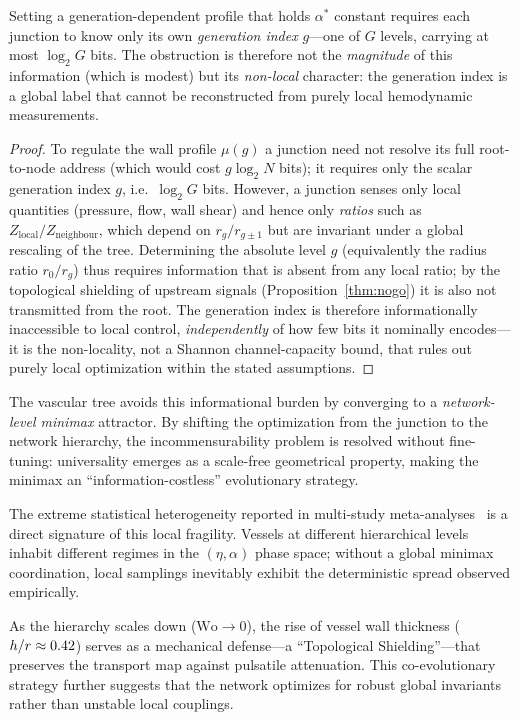 \begin{corollary}
\label{cor:information}
Setting a generation-dependent profile that holds $\alpha^*$ constant
requires each junction to know only its own \emph{generation index} $g$---one of
$G$ levels, carrying at most $\log_2 G$ bits. The obstruction is therefore not
the \emph{magnitude} of this information (which is modest) but its
\emph{non-local} character: the generation index is a global label that cannot
be reconstructed from purely local hemodynamic measurements.
\end{corollary}

\begin{proof}
To regulate the wall profile $\mu(g)$ a junction need not resolve its full
root-to-node address (which would cost $g\log_2 N$ bits); it requires only the
scalar generation index $g$, i.e.\ $\log_2 G$ bits. However, a junction senses
only local quantities (pressure, flow, wall shear) and hence only \emph{ratios}
such as $Z_{\text{local}}/Z_{\text{neighbour}}$, which depend on $r_g/r_{g\pm1}$
but are invariant under a global rescaling of the tree. Determining the absolute
level $g$ (equivalently the radius ratio $r_0/r_g$) thus requires information
that is absent from any local ratio; by the topological shielding of upstream
signals (Proposition~\ref{thm:nogo}) it is also not transmitted from the root.
The generation index is therefore informationally inaccessible to local control,
\emph{independently} of how few bits it nominally encodes---it is the
non-locality, not a Shannon channel-capacity bound, that rules out purely
local optimization within the stated assumptions.
\end{proof}

The vascular tree avoids this informational burden by converging to a
\emph{network-level minimax} attractor. By shifting the optimization from the
junction to the network hierarchy, the incommensurability problem is resolved
without fine-tuning: universality emerges as a scale-free geometrical property,
making the minimax an ``information-costless'' evolutionary strategy.

\begin{remark}
The extreme statistical heterogeneity reported in multi-study
meta-analyses~\cite{taylor2024} is a direct signature of this local fragility.
Vessels at different hierarchical levels inhabit different regimes in the
$(\eta, \alpha)$ phase space; without a global minimax coordination, local
samplings inevitably exhibit the deterministic spread observed empirically.
\end{remark}

\begin{remark}
As the hierarchy scales down ($\text{Wo} \to 0$), the rise of vessel wall
thickness ($h/r \approx 0.42$) serves as a mechanical
defense---a ``Topological Shielding''---that preserves the transport map against
pulsatile attenuation. This co-evolutionary strategy further suggests that the
network optimizes for robust global invariants rather than unstable local
couplings.
\end{remark}
